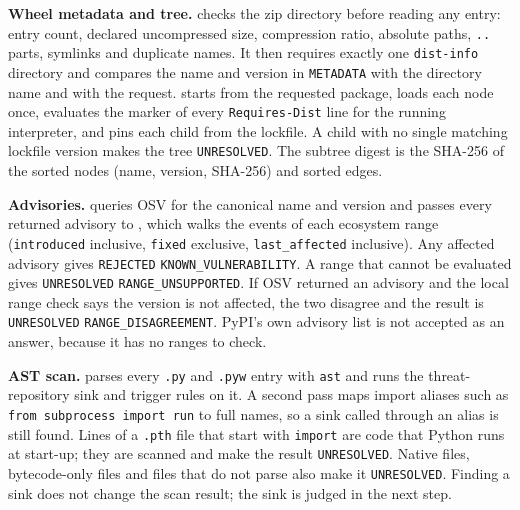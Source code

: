 \begin{sloppypar}
\textbf{Wheel metadata and tree.}  checks the zip directory before reading any entry: entry count, declared uncompressed size, compression ratio, absolute paths, \texttt{..} parts, symlinks and duplicate names. It then requires exactly one \texttt{dist-info} directory and compares the name and version in \texttt{METADATA} with the directory name and with the request.  starts from the requested package, loads each node once, evaluates the marker of every \texttt{Requires-Dist} line for the running interpreter, and pins each child from the lockfile. A child with no single matching lockfile version makes the tree \texttt{UNRESOLVED}. The subtree digest is the SHA-256 of the sorted nodes (name, version, SHA-256) and sorted edges.
\end{sloppypar}

\begin{sloppypar}
\textbf{Advisories.}  queries OSV for the canonical name and version and passes every returned advisory to , which walks the events of each ecosystem range (\texttt{introduced} inclusive, \texttt{fixed} exclusive, \texttt{last\_affected} inclusive). Any affected advisory gives \texttt{REJECTED} \texttt{KNOWN\_VULNERABILITY}. A range that cannot be evaluated gives \texttt{UNRESOLVED} \texttt{RANGE\_UNSUPPORTED}. If OSV returned an advisory and the local range check says the version is not affected, the two disagree and the result is \texttt{UNRESOLVED} \texttt{RANGE\_DISAGREEMENT}. PyPI's own advisory list is not accepted as an answer, because it has no ranges to check.
\end{sloppypar}

\begin{sloppypar}
\textbf{AST scan.}  parses every \texttt{.py} and \texttt{.pyw} entry with \texttt{ast} and runs the threat-repository sink and trigger rules on it. A second pass maps import aliases such as \texttt{from subprocess import run} to full names, so a sink called through an alias is still found. Lines of a \texttt{.pth} file that start with \texttt{import} are code that Python runs at start-up; they are scanned and make the result \texttt{UNRESOLVED}. Native files, bytecode-only files and files that do not parse also make it \texttt{UNRESOLVED}. Finding a sink does not change the scan result; the sink is judged in the next step.
\end{sloppypar}

